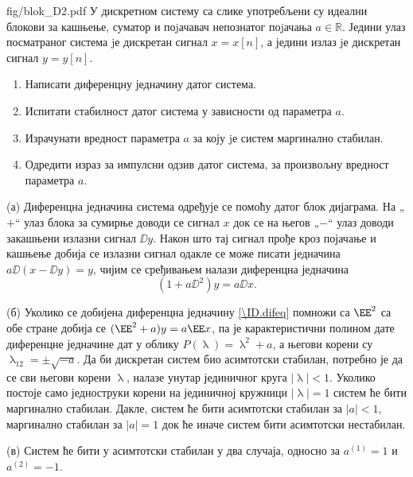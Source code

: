 \begin{slikaDesno}{fig/blok_D2.pdf}
    \PID У дискретном систему са слике употребљени су идеални блокови за кашњење,
    суматор и поjачавач непознатог поjачања $a \in \mathbb R$. 
    Једини улаз посматраног
    система jе дискретан сигнал $x = x[n]$, а једини излаз jе дискретан сигнал $y = y[n]$.
\end{slikaDesno}
\begin{enumerate}[label=(\alph*)]
    \item Написати диференцну једначину датог система.
    \item Испитати  стабилност датог система у зависности од параметра $a$.
    \item Израчунати вредност параметра $a$ за коју jе систем маргинално стабилан.
    \item Одредити израз за импулсни одзив датог система, за произвољну вредност параметра $a$.
\end{enumerate}

\RESENJE
(а) Диференцна једначина система одређује се помоћу датог блок дијаграма. На „$+$“ улаз блока за сумирње 
доводи се сигнал $x$ док се на његов „$-$“ улаз доводи закашњени излазни сигнал $\DD y$. Након што 
тај сигнал прође кроз појачање и кашњење добија се излазни сигнал одакле се може писати 
једначина $a \DD ( x - \DD y) = y$, чијим се сређивањем налази диференцна једначина 
\begin{equation}
    (1 + a \DD^2) y = a \DD x. \label{\ID.difeq}
\end{equation}

(б) Уколико се добијена диференцна једначину \eqref{\ID.difeq} помножи са $\EE^2$ са обе стране добија се 
$(\EE^2 + a)y = a \EE x$, па је карактеристични полином дате диференцне једначине дат у облику 
$P(\uplambda) = \uplambda^2 + a$, а његови корени су 
$\uplambda_{12} = \pm \sqrt{-a}$. Да би дискретан систем био асимтотски стабилан, потребно је да се сви његови 
корени $\uplambda$, налазе унутар јединичног круга $|\uplambda| < 1$. Уколико постоје само 
једноструки корени на јединичној 
кружници $|\uplambda| = 1$ систем ће бити маргинално стабилан. 
Дакле, систем ће бити асимтотски стабилан за $|a| < 1$, маргинално стабилан за $|a| = 1$ док ће иначе 
систем бити асимтотски нестабилан.

(в) Систем ће бити у асимтотски стабилан у два случаја, односно за $a^{(1)} = 1$ и $a^{(2)} = -1$.  

